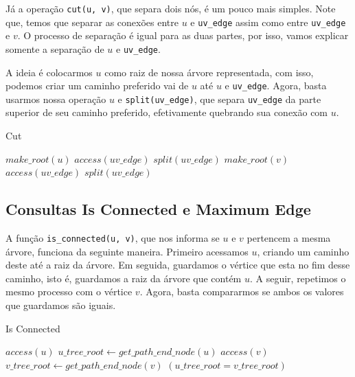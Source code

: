 Já a operação \texttt{cut(u, v)}, que separa dois nós, é um pouco mais simples. Note que, temos que separar as conexões entre $u$ e \texttt{uv\_edge} assim como entre \texttt{uv\_edge} e $v$. O processo de separação é igual para as duas partes, por isso, vamos explicar somente a separação de $u$ e \texttt{uv\_edge}.

A ideia é colocarmos $u$ como raiz de nossa árvore representada, com isso, podemos criar um caminho preferido vai de $u$ até $u$ e \texttt{uv\_edge}. Agora, basta usarmos nossa operação $u$ e \texttt{split(uv\_edge)}, que separa \texttt{uv\_edge} da parte superior de seu caminho preferido, efetivamente quebrando sua conexão com $u$.

\begin{algorithm}[h!]
    \caption{Cut}\label{lct:cut}
    \begin{algorithmic}
        \State {}
        \State $make\_root(u)$
        \State $access(uv\_edge)$
        \State $split(uv\_edge)$
        \State {}
        \State $make\_root(v)$
        \State $access(uv\_edge)$
        \State $split(uv\_edge)$
        \EndFunction
    \end{algorithmic}
\end{algorithm}

\subsection{Consultas Is Connected e Maximum Edge}
\label{subsection:lct-is-connected}

A função \texttt{is\_connected(u, v)}, que nos informa se $u$ e $v$ pertencem a mesma árvore, funciona da seguinte maneira. Primeiro acessamos $u$, criando um caminho deste até a raiz da árvore. Em seguida, guardamos o vértice que esta no fim desse caminho, isto é, guardamos a raiz da árvore que contém $u$. A seguir, repetimos o mesmo processo com o vértice $v$. Agora, basta compararmos se ambos os valores que guardamos são iguais.

\begin{algorithm}[h!]
    \caption{Is Connected}\label{lct:is-connected}
    \begin{algorithmic}
        \State $access(u)$
        \State $u\_tree\_root \gets get\_path\_end\_node(u)$
        \State $access(v)$
        \State $v\_tree\_root \gets get\_path\_end\_node(v)$
        \State \Return $(u\_tree\_root = v\_tree\_root)$
        \EndFunction
    \end{algorithmic}
\end{algorithm}

